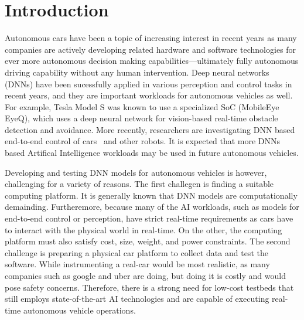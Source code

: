 \section{Introduction} \label{sec:intro}

%
%
Autonomous cars have been a topic of increasing interest in recent
years as many companies are actively developing related hardware
and software technologies for ever more autonomous decision making
capabilities---ultimately fully autonomous driving capability without
any human intervention. Deep neural networks (DNNs) have been
sucessfully applied in various perception and control tasks in 
recent years, and they are important workloads for autonomous vehicles
as well. For example, Tesla Model S was known to use a specialized SoC
(MobileEye EyeQ), which uses a deep neural network for vision-based
real-time obstacle detection and avoidance. More recently, researchers
are investigating DNN based end-to-end control of
cars~\cite{Bojarski2016} and other robots. It is expected that more
DNNs based Artifical Intelligence workloads may be used in future
autonomous vehicles.

Developing and testing DNN models for autonomous vehicles is
however, challenging for a variety of reasons. The first challegen is
finding a suitable computing platform. It is generally known that DNN
models are computationally demainding. Furtheremore, because many of
the AI workloads, such as models for end-to-end control or perception,
have strict real-time requirements as cars have to interact with the
physical world in real-time. On the other, the computing platform must
also satisfy cost, size, weight, and power constraints. 
The second challenge is preparing a
physical car platform to collect data and test the software. While
instrumenting a real-car would be most realistic, as many
companies such as google and uber are doing, but doing it is costly
and would pose safety concerns. 
Therefore, there is a strong need for low-cost testbeds that still
employs state-of-the-art AI technologies and are capable of executing
real-time autonomous vehicle operations.


